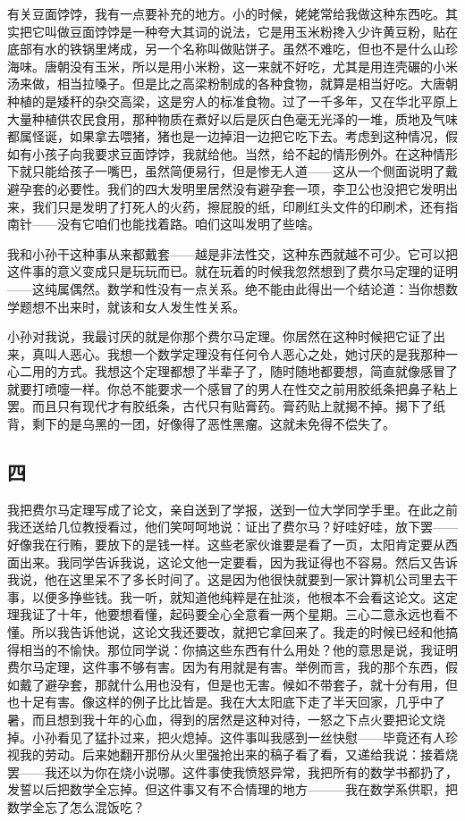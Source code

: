 有关豆面饽饽，我有一点要补充的地方。小的时候，姥姥常给我做这种东西吃。其实把它叫做豆面饽饽是一种夸大其词的说法，它是用玉米粉搀入少许黄豆粉，贴在底部有水的铁锅里烤成，另一个名称叫做贴饼子。虽然不难吃，但也不是什么山珍海味。唐朝没有玉米，所以是用小米粉，这一来就不好吃，尤其是用连壳碾的小米汤来做，相当拉嗓子。但是比之高梁粉制成的各种食物，就算是相当好吃。大唐朝种植的是矮秆的杂交高梁，这是穷人的标准食物。过了一千多年，又在华北平原上大量种植供农民食用，那种物质在煮好以后是灰白色毫无光泽的一堆，质地及气味都属怪诞，如果拿去喂猪，猪也是一边掉泪一边把它吃下去。考虑到这种情况，假如有小孩子向我要求豆面饽饽，我就给他。当然，给不起的情形例外。在这种情形下就只能给孩子一嘴巴，虽然简便易行，但是惨无人道——这从一个侧面说明了戴避孕套的必要性。我们的四大发明里居然没有避孕套一项，李卫公也没把它发明出来，我们只是发明了打死人的火药，擦屁股的纸，印刷红头文件的印刷术，还有指南针——没有它咱们也能找着路。咱们这叫发明了些啥。 

我和小孙干这种事从来都戴套——越是非法性交，这种东西就越不可少。它可以把这件事的意义变成只是玩玩而已。就在玩着的时候我忽然想到了费尔马定理的证明——这纯属偶然。数学和性没有一点关系。绝不能由此得出一个结论道：当你想数学题想不出来时，就该和女人发生性关系。 

小孙对我说，我最讨厌的就是你那个费尔马定理。你居然在这种时候把它证了出来，真叫人恶心。我想一个数学定理没有任何令人恶心之处，她讨厌的是我那种一心二用的方式。我想这个定理都想了半辈子了，随时随地都要想，简直就像感冒了就要打喷嚏一样。你总不能要求一个感冒了的男人在性交之前用胶纸条把鼻子粘上罢。而且只有现代才有胶纸条，古代只有贴膏药。膏药贴上就揭不掉。揭下了纸背，剩下的是乌黑的一团，好像得了恶性黑瘤。这就未免得不偿失了。 

\subsection{四} 

我把费尔马定理写成了论文，亲自送到了学报，送到一位大学同学手里。在此之前我还送给几位教授看过，他们笑呵呵地说：证出了费尔马？好哇好哇，放下罢——好像我在行贿，要放下的是钱一样。这些老家伙谁要是看了一页，太阳肯定要从西面出来。我同学告诉我说，这论文他一定要看，因为我证得也不容易。然后又告诉我说，他在这里呆不了多长时间了。这是因为他很快就要到一家计算机公司里去干事，以便多挣些钱。我一听，就知道他纯粹是在扯淡，他根本不会看这论文。这定理我证了十年，他要想看懂，起码要全心全意看一两个星期。三心二意永远也看不懂。所以我告诉他说，这论文我还要改，就把它拿回来了。我走的时候已经和他搞得相当的不愉快。那位同学说：你搞这些东西有什么用处？他的意思是说，我证明费尔马定理，这件事不够有害。因为有用就是有害。举例而言，我的那个东西，假如戴了避孕套，那就什么用也没有，但是也无害。候如不带套子，就十分有用，但也十足有害。像这样的例子比比皆是。我在大太阳底下走了半天回家，几乎中了暑，而且想到我十年的心血，得到的居然是这种对待，一怒之下点火要把论文烧掉。小孙看见了猛扑过来，把火熄掉。这件事叫我感到一丝快慰——毕竟还有人珍视我的劳动。后来她翻开那份从火里强抢出来的稿子看了看，又递给我说：接着烧罢——我还以为你在烧小说哪。这件事使我愤怒异常，我把所有的数学书都扔了，发誓以后把数学全忘掉。但这件事又有不合情理的地方———我在数学系供职，把数学全忘了怎么混饭吃？ 

